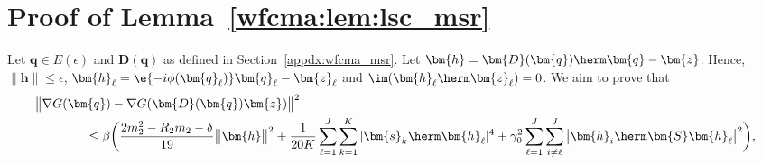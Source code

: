 			
			
			
			\section{Proof of Lemma~\ref{wfcma:lem:lsc_msr}}\label{wfcma:appdx:lsc_msr}
			Let $\bm{q}\in E(\epsilon)$ and $\bm{D}(\bm{q})$ as defined in Section~\ref{appdx:wfcma_msr}. Let $\bm{h}=\bm{D}(\bm{q})\herm\bm{q}-\bm{z}$. Hence, $\|\bm{h}\|\leq\epsilon$, $\bm{h}_{\ell}=\e{-i\phi(\bm{q}_{\ell})}\bm{q}_{\ell}-\bm{z}_{\ell}$ and $\im(\bm{h}_{\ell}\herm\bm{z}_{\ell})=0$. We aim to prove that
			\begin{align}
				&\big\|\nabla G(\bm{q})-\nabla G(\bm{D}(\bm{q})\bm{z})\big\|^2 \nonumber\\
				&\qquad\qquad\leq \beta\bigg(\frac{2  m_2^2-R_2m_2-\delta}{19}\big\|\bm{h}\big\|^2+\frac{1}{20K}\sum_{{\ell}=1}^J\sum_{k=1}^K|\bm{s}_k\herm\bm{h}_{\ell}|^4+\gamma_0^2\sum_{{\ell}=1}^J\sum_{i\neq {\ell}}^J\big|\bm{h}_i\herm\bm{S}\bm{h}_{\ell}\big|^2\bigg),\nonumber
			\end{align}
			
